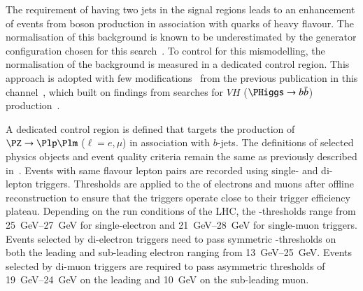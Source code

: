 The requirement of having two \btagged jets in the signal regions leads to an
enhancement of events from \PZ boson production in association with quarks of
heavy flavour. The normalisation of this background is known to be
underestimated by the generator configuration chosen for this
search~\cite{STDM-2017-38}. To control for this mismodelling, the normalisation
of the \ZHF background is measured in a dedicated control region.
This approach is adopted with few modifications~\cite{bokan} from the previous
publication in this channel~\cite{HIGG-2016-16-witherratum}, which built on
findings from searches for $VH$ ($\PHiggs \to \bbbar$)
production~\cite{HIGG-2016-29}.

A dedicated control region is defined that targets the production of
$\PZ \ra \Plp\Plm$ ($\ell = e , \mu$) in association with $b$-jets. The
definitions of selected physics objects and event quality criteria remain the
same as previously described
in~. Events with same
flavour lepton pairs are recorded using single- and di-lepton
triggers. Thresholds are applied to the \pT of electrons and muons after offline
reconstruction to ensure that the triggers operate close to their trigger
efficiency plateau. Depending on the run conditions of the LHC, the
\pT-thresholds range from \SIrange{25}{27}{\GeV} for single-electron and
\SIrange{21}{28}{\GeV} for single-muon triggers. Events selected by di-electron
triggers need to pass symmetric \pT-thresholds on both the leading and
sub-leading electron ranging from \SIrange{13}{25}{\GeV}. Events selected by
di-muon triggers are required to pass asymmetric thresholds of
\SIrange{19}{24}{\GeV} on the leading and \SI{10}{\GeV} on the sub-leading muon.

